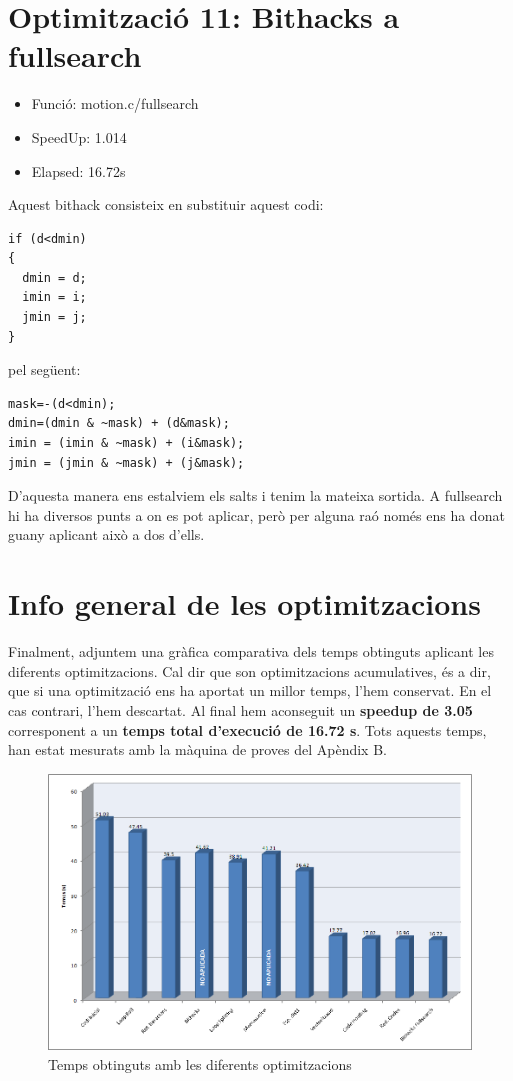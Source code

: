 \section{Optimitzaci\'o 11: Bithacks a fullsearch}
\begin{itemize}
\item{Funció: motion.c/fullsearch}
\item{SpeedUp:  1.014}
\item{Elapsed:  16.72s}
\end{itemize}

Aquest bithack consisteix en substituir aquest codi:

\begin{lstlisting}
if (d<dmin)
{
  dmin = d;
  imin = i;
  jmin = j;
}
\end{lstlisting}

pel següent:

\begin{lstlisting}
mask=-(d<dmin);
dmin=(dmin & ~mask) + (d&mask);
imin = (imin & ~mask) + (i&mask);
jmin = (jmin & ~mask) + (j&mask);
\end{lstlisting}

D'aquesta manera ens estalviem els salts i tenim la mateixa sortida. A fullsearch hi ha diversos punts a on es pot aplicar, però per alguna raó només ens ha donat guany aplicant això a dos d'ells.

\section{Info general de les optimitzacions}

Finalment, adjuntem una gràfica comparativa dels temps obtinguts aplicant les diferents optimitzacions. Cal dir que son optimitzacions acumulatives, és a dir, que si una optimització ens ha aportat un millor temps, l'hem conservat. En el cas contrari, l'hem descartat. Al final hem aconseguit un \textbf{speedup de 3.05} corresponent a un \textbf{temps total d'execució de 16.72 s}. Tots aquests temps, han estat mesurats amb la màquina de proves del Apèndix B.


\begin{figure}[hbtp]
\begin{center}
\includegraphics[scale=0.4]{img/image001.png}
\caption{Temps obtinguts amb les diferents optimitzacions}
\end{center}
\end{figure}
